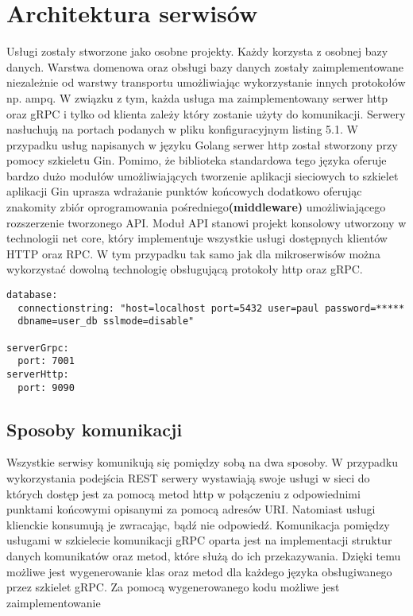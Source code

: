 \section{Architektura serwisów}
\par Usługi zostały stworzone jako osobne projekty. Każdy korzysta z osobnej bazy danych. Warstwa domenowa oraz obsługi bazy danych zostały zaimplementowane niezależnie od warstwy transportu umożliwiając wykorzystanie innych protokołów np. ampq. W związku z tym, każda usługa ma zaimplementowany serwer http oraz gRPC i tylko od klienta zależy który zostanie użyty do komunikacji. Serwery nasłuchują na portach podanych w pliku konfiguracyjnym listing 5.1. W przypadku usług napisanych w języku Golang serwer http został stworzony przy pomocy szkieletu Gin. Pomimo, że biblioteka standardowa tego języka oferuje bardzo dużo modułów umożliwiających tworzenie aplikacji sieciowych to szkielet aplikacji Gin uprasza wdrażanie punktów końcowych dodatkowo oferując znakomity zbiór oprogramowania pośredniego\textbf{(middleware)} umożliwiającego rozszerzenie tworzonego API. Moduł API stanowi projekt konsolowy utworzony w technologii net core, który implementuje wszystkie usługi dostępnych klientów HTTP oraz RPC. W tym przypadku tak samo jak dla mikroserwisów można wykorzystać dowolną technologię obsługującą protokoły http oraz gRPC.
\begin{lstlisting}[columns=fullflexible,  caption=Przykład konfiguracji usługi]
database:
  connectionstring: "host=localhost port=5432 user=paul password=***** 
  dbname=user_db sslmode=disable"

serverGrpc:
  port: 7001
serverHttp:
  port: 9090
\end{lstlisting}
\subsection{Sposoby komunikacji}
\par Wszystkie serwisy komunikują się pomiędzy sobą na dwa sposoby. W przypadku wykorzystania podejścia REST serwery wystawiają swoje usługi w sieci do których dostęp jest za pomocą metod http w połączeniu z odpowiednimi punktami końcowymi opisanymi za pomocą adresów URI. Natomiast usługi klienckie konsumują je zwracając, bądź nie odpowiedź.
Komunikacja pomiędzy usługami w szkielecie komunikacji gRPC oparta jest na implementacji struktur danych komunikatów oraz metod, które służą do ich przekazywania. Dzięki temu możliwe jest wygenerowanie klas oraz metod dla każdego języka obsługiwanego przez szkielet gRPC. Za pomocą wygenerowanego kodu możliwe jest zaimplementowanie
